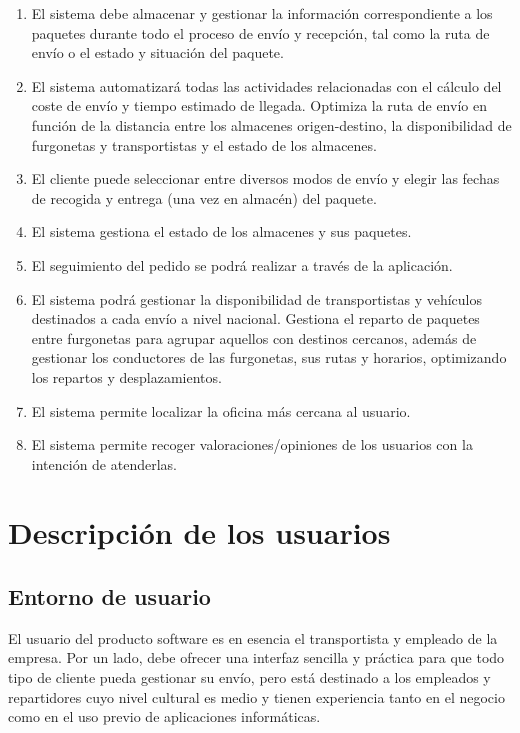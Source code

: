 \begin{enumerate}
	\item El sistema debe almacenar y gestionar la información correspondiente a los paquetes durante todo el proceso de envío y recepción, tal como la ruta de envío o el estado y situación del paquete.
	\item El sistema automatizará todas las actividades relacionadas con el cálculo del coste de envío y tiempo estimado de llegada. Optimiza la ruta de envío en función de la distancia entre los almacenes origen-destino, la disponibilidad de furgonetas y transportistas y el estado de los almacenes.
	\item El cliente puede seleccionar entre diversos modos de envío y elegir las fechas de recogida y entrega (una vez en almacén) del paquete.
	\item El sistema gestiona el estado de los almacenes y sus paquetes.
	\item El seguimiento del pedido se podrá realizar a través de la aplicación.
	\item El sistema podrá gestionar la disponibilidad de transportistas y vehículos destinados a cada envío a nivel nacional. Gestiona el reparto de paquetes entre furgonetas para agrupar aquellos con destinos cercanos, además de gestionar los conductores de las furgonetas, sus rutas y horarios, optimizando los repartos y desplazamientos.
	\item El sistema permite localizar la oficina más cercana al usuario.
	\item El sistema permite recoger valoraciones/opiniones de los usuarios con la intención de atenderlas.\\
	 
\end{enumerate}

\newpage

\section{Descripción de los usuarios}
	\subsection{Entorno de usuario}
		El usuario del producto software es en esencia el transportista y empleado de la empresa. Por un lado, debe ofrecer una interfaz sencilla y práctica para que todo tipo de cliente pueda gestionar su envío, pero está destinado a los empleados y repartidores cuyo nivel cultural es medio y tienen experiencia tanto en el negocio como en el uso previo de aplicaciones informáticas.
	
